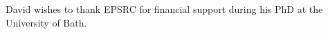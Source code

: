 \documentclass[smallextended]{svjour3}       %
\begin{document}
%
%


\begin{acknowledgements}
David wishes to thank EPSRC for financial support during his PhD at the University of Bath.
\end{acknowledgements}

\end{document}
